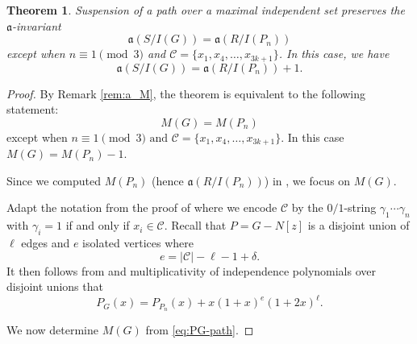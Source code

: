 \documentclass[12pt]{amsart}
\theoremstyle{plain}
\newtheorem{thm}{Theorem}[section]
\theoremstyle{definition}
\begin{document}
\begin{thm}\label{thm:path_a_inv}
Suspension of a path over a maximal independent set preserves the $\mathfrak a$-invariant
 $$\mathfrak{a} (S/ I(G))= \mathfrak{a} (R/I(P_n))$$  
 except when $n\equiv 1 \pmod 3$ and $\mathcal{C}=\{x_1,x_4,\ldots, x_{3k+1}\}$. In this case, we have 
 $$\mathfrak{a} (S/ I(G))= \mathfrak{a} (R/I(P_n))+1.$$  
\end{thm}

\begin{proof}
By Remark \ref{rem:a_M}, the theorem is equivalent to the following statement:
\[
M(G)=M(P_n)
\]
except when $n\equiv 1\pmod 3\text{ and }\mathcal C=\{x_1,x_4,\ldots,x_{3k+1}\}$. In this case \(M(G)=M(P_n)-1\). 

Since we computed $M(P_n)$ (hence $\mathfrak a (R/I(P_n))$) in , we focus on  \(M(G)\).

Adapt the notation from the proof of   where we encode \(\mathcal C\) by the \(0/1\)-string
\(\gamma_1\cdots\gamma_n\) with \(\gamma_i=1\) if and only if \(x_i\in\mathcal C\). Recall that \(P=G-N[z]\) is a disjoint union of \(\ell\) edges and \(e\) isolated vertices where
\[
e=|\mathcal C|-\ell-1+\delta.
\]
It then follows from  and multiplicativity of independence polynomials over disjoint unions that
\begin{equation}\label{eq:PG-path}
P_G(x)=P_{P_n}(x)+x(1+x)^e(1+2x)^\ell.
\end{equation}

We now determine \(M(G)\) from \eqref{eq:PG-path}.


\end{proof}
\end{document}
